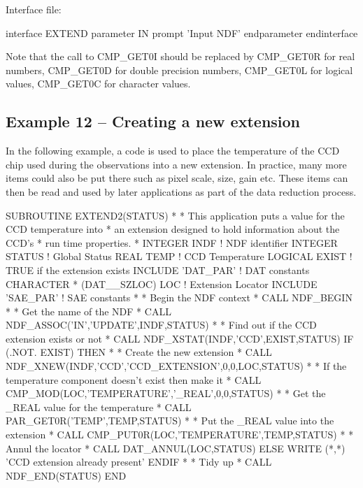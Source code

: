 \documentclass[11pt,nolof]{starlink}
\begin{document}
Interface file:

\begin{small}
\begin{terminalv}
interface EXTEND
  parameter IN
  prompt 'Input NDF'
  endparameter
endinterface
\end{terminalv}
\end{small}

Note that the call to \textsf{CMP\_GET0I} should be replaced by \textsf{CMP\_GET0R} for real numbers, \textsf{CMP\_GET0D} for double precision numbers,
\textsf{CMP\_GET0L} for logical values, \textsf{CMP\_GET0C} for character values.

\subsection{Example 12 -- Creating a new extension}

In the following example, a code is used to place the temperature of the CCD
chip used during the observations into a new extension. In practice, many
more items could also be put there such as pixel scale, size, gain etc.
These items can then be read and used by later applications as part of
the data reduction process.

\begin{small}
\begin{terminalv}
       SUBROUTINE EXTEND2(STATUS)
*
* This application puts a value for the CCD temperature into
* an extension designed to hold information about the CCD's
* run time properties.
*
       INTEGER INDF                 ! NDF identifier
       INTEGER STATUS               ! Global Status
       REAL TEMP                    ! CCD Temperature
       LOGICAL EXIST                ! TRUE if the extension exists
       INCLUDE 'DAT_PAR'            ! DAT constants
       CHARACTER * (DAT__SZLOC) LOC ! Extension Locator
       INCLUDE 'SAE_PAR'            ! SAE constants
*
* Begin the NDF context
*
       CALL NDF_BEGIN
*
* Get the name of the NDF
*
       CALL NDF_ASSOC('IN','UPDATE',INDF,STATUS)
*
* Find out if the CCD extension exists or not
*
       CALL NDF_XSTAT(INDF,'CCD',EXIST,STATUS)
       IF (.NOT. EXIST) THEN
*
* Create the new extension
*
         CALL NDF_XNEW(INDF,'CCD','CCD_EXTENSION',0,0,LOC,STATUS)
*
* If the temperature component doesn't exist then make it
*
         CALL CMP_MOD(LOC,'TEMPERATURE','_REAL',0,0,STATUS)
*
* Get the _REAL value for the temperature
*
         CALL PAR_GET0R('TEMP',TEMP,STATUS)
*
* Put the _REAL value into the extension
*
         CALL CMP_PUT0R(LOC,'TEMPERATURE',TEMP,STATUS)
*
* Annul the locator
*
         CALL DAT_ANNUL(LOC,STATUS)
       ELSE
         WRITE (*,*) 'CCD extension already present'
       ENDIF
*
* Tidy up
*
       CALL NDF_END(STATUS)
       END
\end{terminalv}
\end{small}
\end{document}
